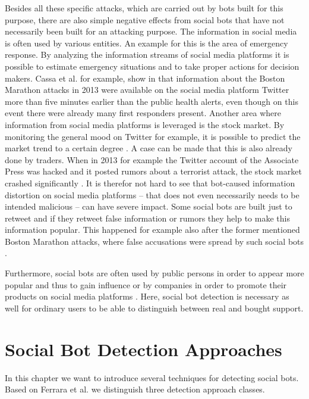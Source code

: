 Besides all these specific attacks, which are carried out by bots built for this purpose, there are also simple negative effects from social bots that have not necessarily been built for an attacking purpose.
The information in social media is often used by various entities. An example for this is the area of emergency response. By analyzing the information streams of social media platforms it is possible to estimate emergency situations and to take proper actions for decision makers. Cassa et al. for example, show in \cite{cassa} that information about the Boston Marathon attacks in 2013 were available on the social media platform Twitter more than five minutes earlier than the public health alerts, even though on this event there were already many first responders present.  Another area where information from social media platforms is leveraged is the stock market. By monitoring the general mood on Twitter for example, it is possible to predict the market trend to a certain degree \cite{bollen}. A case can be made that this is also already done by traders. When in 2013 for example the Twitter account of the Associate Press was hacked and it posted rumors about a terrorist attack, the stock market crashed significantly \cite{ferrara15}. It is therefor not hard to see that bot-caused information distortion on social media platforms -- that does not even necessarily needs to be intended malicious -- can have severe impact. Some social bots are built just to retweet and if they retweet false information or rumors they help to make this information popular. This happened for example also after the former mentioned Boston Marathon attacks, where false accusations were spread by such social bots \cite{gupta}. 

Furthermore, social bots are often used by public persons in order to appear more popular and thus to gain influence or by companies in order to promote their products on social media platforms \cite{stringhini}. Here, social bot detection is necessary as well for ordinary users to be able to distinguish between real and bought support.





\section{Social Bot Detection Approaches}
In this chapter we want to introduce several techniques for detecting social bots. Based on Ferrara et al. \cite{ferrara15} we distinguish three detection approach classes. 

